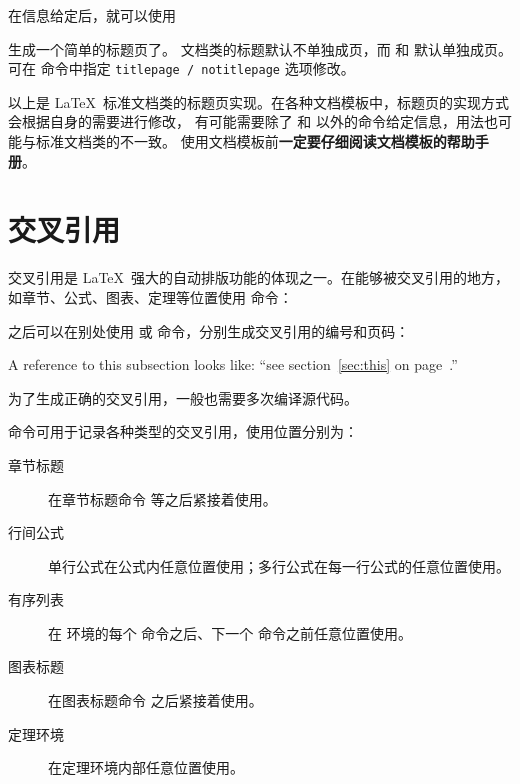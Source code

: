 在信息给定后，就可以使用
\begin{command}
\end{command}
生成一个简单的标题页了。 文档类的标题默认不单独成页，而  和  默认单独成页。
可在  命令中指定 \texttt{titlepage / notitlepage} 选项修改。

以上是 \LaTeX\ 标准文档类的标题页实现。在各种文档模板中，标题页的实现方式会根据自身的需要进行修改，
有可能需要除了  和  以外的命令给定信息，用法也可能与标准文档类的不一致。
使用文档模板前\textbf{一定要仔细阅读文档模板的帮助手册}。

\section{交叉引用}\label{sec:crossref}

交叉引用是 \LaTeX\ 强大的自动排版功能的体现之一。在能够被交叉引用的地方，如章节、公式、图表、定理等位置使用  命令：
\begin{command}
\end{command}

之后可以在别处使用  或  命令，分别生成交叉引用的编号和页码：
\begin{command}
 \quad
{}
\end{command}
\begin{example}
A reference to this subsection
\label{sec:this} looks like:
``see section~\ref{sec:this} on
page~\pageref{sec:this}.''
\end{example}

为了生成正确的交叉引用，一般也需要多次编译源代码。

 命令可用于记录各种类型的交叉引用，使用位置分别为：
\begin{description}
  \item[章节标题] 在章节标题命令  等之后紧接着使用。
  \item[行间公式] 单行公式在公式内任意位置使用；多行公式在每一行公式的任意位置使用。
  \item[有序列表] 在  环境的每个  命令之后、下一个  命令之前任意位置使用。
  \item[图表标题] 在图表标题命令  之后紧接着使用。
  \item[定理环境] 在定理环境内部任意位置使用。
\end{description}

